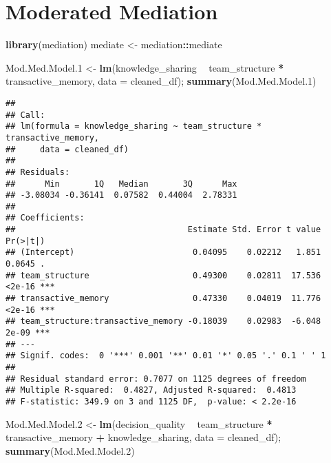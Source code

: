 \documentclass[]{article}
\newenvironment{Shaded}{\begin{snugshade}}{\end{snugshade}}
\newcommand{\DataTypeTok}[1]{\textcolor[rgb]{0.13,0.29,0.53}{#1}}
\newcommand{\FloatTok}[1]{\textcolor[rgb]{0.00,0.00,0.81}{#1}}
\newcommand{\KeywordTok}[1]{\textcolor[rgb]{0.13,0.29,0.53}{\textbf{#1}}}
\newcommand{\NormalTok}[1]{#1}
\newcommand{\OperatorTok}[1]{\textcolor[rgb]{0.81,0.36,0.00}{\textbf{#1}}}
\newcommand{\StringTok}[1]{\textcolor[rgb]{0.31,0.60,0.02}{#1}}
\begin{document}
\hypertarget{moderated-mediation}{%
\section{Moderated Mediation}\label{moderated-mediation}}

\begin{Shaded}
\begin{Highlighting}[]
\KeywordTok{library}\NormalTok{(mediation)}
\NormalTok{mediate <-}\StringTok{ }\NormalTok{mediation}\OperatorTok{::}\NormalTok{mediate}

\NormalTok{Mod.Med.Model}\FloatTok{.1}\NormalTok{ <-}\StringTok{ }\KeywordTok{lm}\NormalTok{(knowledge_sharing }\OperatorTok{~}\StringTok{ }\NormalTok{team_structure }\OperatorTok{*}\StringTok{ }\NormalTok{transactive_memory, }\DataTypeTok{data =}\NormalTok{ cleaned_df); }\KeywordTok{summary}\NormalTok{(Mod.Med.Model}\FloatTok{.1}\NormalTok{)}
\end{Highlighting}
\end{Shaded}

\begin{verbatim}
## 
## Call:
## lm(formula = knowledge_sharing ~ team_structure * transactive_memory, 
##     data = cleaned_df)
## 
## Residuals:
##      Min       1Q   Median       3Q      Max 
## -3.08034 -0.36141  0.07582  0.44004  2.78331 
## 
## Coefficients:
##                                   Estimate Std. Error t value Pr(>|t|)    
## (Intercept)                        0.04095    0.02212   1.851   0.0645 .  
## team_structure                     0.49300    0.02811  17.536   <2e-16 ***
## transactive_memory                 0.47330    0.04019  11.776   <2e-16 ***
## team_structure:transactive_memory -0.18039    0.02983  -6.048    2e-09 ***
## ---
## Signif. codes:  0 '***' 0.001 '**' 0.01 '*' 0.05 '.' 0.1 ' ' 1
## 
## Residual standard error: 0.7077 on 1125 degrees of freedom
## Multiple R-squared:  0.4827, Adjusted R-squared:  0.4813 
## F-statistic: 349.9 on 3 and 1125 DF,  p-value: < 2.2e-16
\end{verbatim}

\begin{Shaded}
\begin{Highlighting}[]
\NormalTok{Mod.Med.Model}\FloatTok{.2}\NormalTok{ <-}\StringTok{ }\KeywordTok{lm}\NormalTok{(decision_quality }\OperatorTok{~}\StringTok{ }\NormalTok{team_structure }\OperatorTok{*}\StringTok{ }\NormalTok{transactive_memory }\OperatorTok{+}\StringTok{ }\NormalTok{knowledge_sharing, }\DataTypeTok{data =}\NormalTok{ cleaned_df); }\KeywordTok{summary}\NormalTok{(Mod.Med.Model}\FloatTok{.2}\NormalTok{)}
\end{Highlighting}
\end{Shaded}
\end{document}
